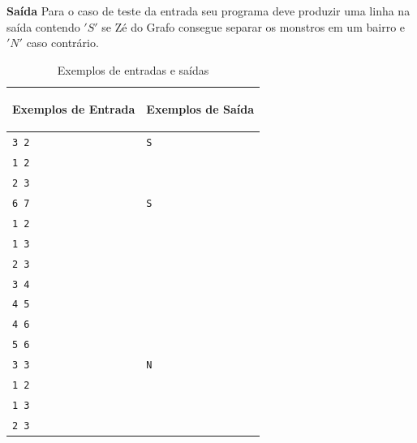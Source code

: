 \vspace{0.3cm}
\textbf{Saída}
Para o caso de teste da entrada seu programa deve produzir uma linha na saída contendo $'S'$ se Zé do Grafo consegue separar os monstros em um bairro e $'N'$ caso contrário.
\begin{table}[h]
    \centering
    \begin{tabular}{|p{7cm}|p{7cm}|}
        \hline
        \begin{center}
            \vspace{-0.3cm}
            \textbf{Exemplos de Entrada}
            \vspace{-0.3cm}
        \end{center} 
         &  
        \begin{center}
            \vspace{-0.3cm}
            \textbf{Exemplos de Saída}
            \vspace{-0.3cm}
        \end{center} \\ \hline
         \texttt{3 2} & \texttt{S} \\  
         \texttt{1 2} & \texttt{} \\
         \texttt{2 3} & \texttt{} \\
         \hline
         \texttt{6 7} & \texttt{S} \\  
         \texttt{1 2} & \texttt{} \\
         \texttt{1 3} & \texttt{} \\
         \texttt{2 3} & \texttt{} \\
         \texttt{3 4} & \texttt{} \\
         \texttt{4 5} & \texttt{} \\
         \texttt{4 6} & \texttt{} \\
         \texttt{5 6} & \texttt{} \\
         \hline
         \texttt{3 3} & \texttt{N} \\  
         \texttt{1 2} & \texttt{} \\
         \texttt{1 3} & \texttt{} \\
         \texttt{2 3} & \texttt{} \\
         \hline
    \end{tabular}
    \caption{Exemplos de entradas e saídas}
    \label{tab:inputJ}
\end{table}

\newpage

\begin{center}
\noindent

\end{center}
